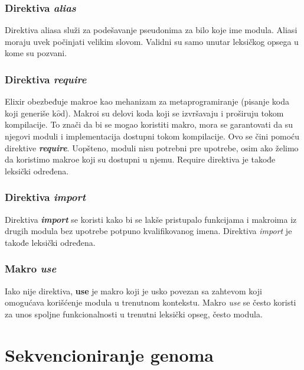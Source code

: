 \documentclass[12pt,oneside]{memoir}
\begin{document}


\subsection{Direktiva \textit{alias}}
Direktiva aliasa služi za podešavanje pseudonima za bilo koje ime modula. Aliasi moraju uvek počinjati velikim slovom. Validni su samo unutar leksičkog opsega u kome su pozvani.

\subsection{Direktiva \textit{require}}
Elixir obezbeđuje makroe kao mehanizam za metaprogramiranje (pisanje koda koji generiše k$\hat{o}$d). Makroi su delovi koda koji se izvršavaju i proširuju tokom kompilacije. To znači da bi se mogao koristiti makro, mora se garantovati da su njegovi moduli i implementacija dostupni tokom kompilacije. Ovo se čini pomoću direktive \textbf{\textit{require}}. Uopšteno, moduli nisu potrebni pre upotrebe, osim ako želimo da koristimo makroe koji su dostupni u njemu. Require direktiva je takođe leksički određena.

\subsection{Direktiva \textit{import}}
Direktiva \textbf{\textit{import}} se koristi kako bi se lakše pristupalo funkcijama i makroima iz drugih modula bez upotrebe potpuno kvalifikovanog imena. Direktiva \textit{import} je takođe leksički određena. 

\subsection{Makro \textit{\textit{use}}}
Iako nije direktiva, \textbf{use} je makro koji je usko povezan sa zahtevom koji omogućava korišćenje modula u trenutnom kontekstu. Makro \textit{use} se često koristi za unos spoljne funkcionalnosti u trenutni leksički opseg, često modula.


\chapter{Sekvencioniranje genoma}
\label{poglavlje:Bio}
\end{document}
